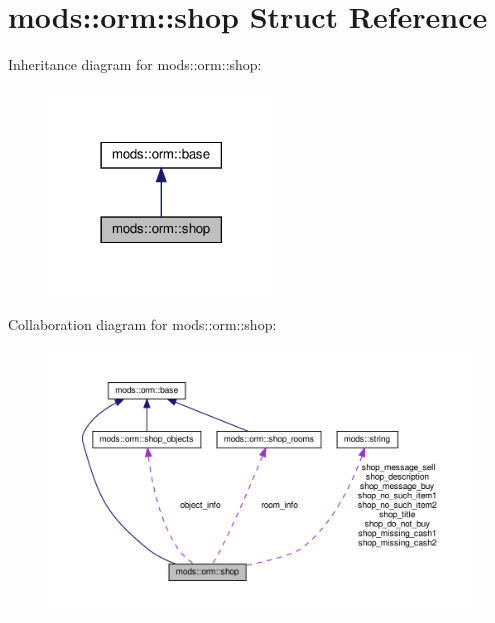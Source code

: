 \hypertarget{structmods_1_1orm_1_1shop}{}\section{mods\+:\+:orm\+:\+:shop Struct Reference}
\label{structmods_1_1orm_1_1shop}


Inheritance diagram for mods\+:\+:orm\+:\+:shop\+:
\nopagebreak
\begin{figure}[H]
\begin{center}
\leavevmode
\includegraphics[width=170pt]{structmods_1_1orm_1_1shop__inherit__graph}
\end{center}
\end{figure}


Collaboration diagram for mods\+:\+:orm\+:\+:shop\+:
\nopagebreak
\begin{figure}[H]
\begin{center}
\leavevmode
\includegraphics[width=350pt]{structmods_1_1orm_1_1shop__coll__graph}
\end{center}
\end{figure}
